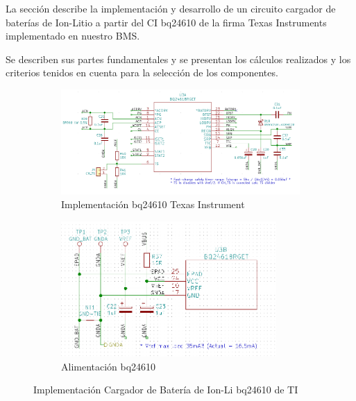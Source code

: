 \documentclass[10pt, a4paper]{report}
\begin{document}
La sección describe la implementación y desarrollo de un circuito cargador de
baterías de Ion-Litio a partir del \acrfull{CI} bq24610 de la firma Texas
Instruments implementado en nuestro \acrshort{BMS}.

Se describen sus partes fundamentales y se presentan los cálculos realizados y
los criterios tenidos en cuenta para la selección de los componentes. 

\begin{figure}[h!]
    \centering
    \begin{subfigure}[t]{0.6\textwidth}
        \centering
        \includegraphics[width=1.1\textwidth]{hardware/bat_charger/bc_ic.png}
        \caption{Implementación bq24610 Texas Instrument}
        \label{fig:bc_ic_ti}
    \end{subfigure}
    \hfill
    \begin{subfigure}[t]{0.35\textwidth}
        \centering
        \includegraphics[width=0.9\textwidth]{hardware/bat_charger/bc_ic_power_supply.png}
        \caption{Alimentación bq24610}
        \label{fig:bc_ic_power_supply}
    \end{subfigure}
    \caption{Implementación Cargador de Batería de Ion-Li bq24610 de TI}
    \label{fig:bc_ic}
\end{figure}
\FloatBarrier
\end{document}
